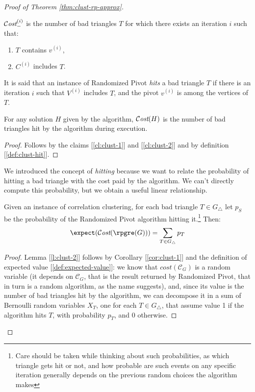 \begin{proof}[Proof of Theorem \ref{thm:clust-rp-approx}]
    \begin{claim}\label{cl:clust-2}
        $\mathcal{C}\textit{ost}_-^{(i)}$ is the number of bad triangles $T$ for which there exists an iteration $i$ such that:
        \begin{enumerate}
            \item $T$ contains $v^{(i)}$,
            \item $C^{(i)}$ includes $T$.
        \end{enumerate}
    \end{claim}

    \begin{definition}[Hit]\label{def:clust-hit}
        It is said that an instance of Randomized Pivot \emph{hits} a bad triangle $T$ if there is an iteration $i$ such that $V^{(i)}$ includes $T$, and the pivot $v^{(i)}$ is among the vertices of $T$.
    \end{definition}

    \begin{corollary}\label{cor:clust-1}
        For any solution $H$ given by the algorithm, $\mathcal{C}\textit{ost}(H)$ is the number of bad triangles hit by the algorithm during execution.
    \end{corollary}

    \begin{proof}
        Follows by the claims [\ref{cl:clust-1}] and [\ref{cl:clust-2}] and by definition [\ref{def:clust-hit}].
    \end{proof}
    
    We introduced the concept of \textit{hitting} because we want to relate the probability of hitting a bad triangle with the cost paid by the algorithm. We can't directly compute this probability, but we obtain a useful linear relationship.
    \begin{lemma}\label{l:clust-2}
        Given an instance of correlation clustering, for each bad triangle $T \in G_\triangle$ let $p_S$ be the probability of the Randomized Pivot algorithm hitting it.\footnote{Care should be taken while thinking about such probabilities, as which triangle gets hit or not, and how probable are such events on any specific iteration generally depends on the previous random choices the algorithm makes} Then:
        \[
            \expect(\cost(\rpgre(G))) = \sum_{T \in G_\triangle} p_T
        \]
    \end{lemma}

    \begin{proof}
        Lemma [\ref{l:clust-2}] follows by Corollary [\ref{cor:clust-1}] and the definition of expected value [\ref{def:expected-value}]: we know that $cost(\mathscr{C}_G)$ is a random variable (it depends on $\mathscr{C}_G$, that is the result returned by Randomized Pivot, that in turn is a random algorithm, as the name suggests), and, since its value is the number of bad triangles hit by the algorithm, we can decompose it in a sum of Bernoulli random variables $X_T$, one for each $T \in G_\triangle$, that assume value 1 if the algorithm hits $T$, with probability $p_T$, and 0 otherwise.
    \end{proof}


\end{proof}
